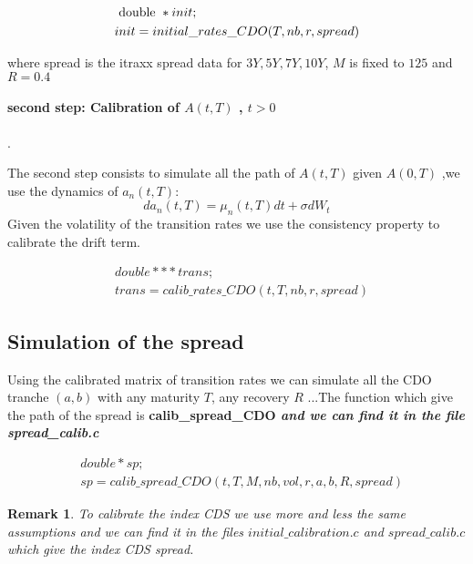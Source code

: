 \documentclass[reqno,11pt,twoside,english]{report}
\newtheorem{Remark}{Remark}
\newcommand{\1}{{1} \hspace{-0.25 em}{\rm I}}
\begin{document}
\begin{equation*}
\begin{split}
&\hbox{ double }*init;\\
&init=initial\_rates\_CDO(T,nb,r,spread)
\end{split}
\end{equation*}

where spread is the itraxx spread data  for  $3Y,5Y,7Y,10 Y$, $M$ is fixed to $125$ and $R=0.4$ 

\paragraph{ second step: Calibration of $A(t,T)$ , $t>0$}
.\par\medskip
The second step consists to simulate all the path of $A(t,T)$ given $A(0,T)$ ,we use the dynamics of $a_n(t,T)$:
$$da_n(t,T)=\mu_n(t,T)dt +\sigma dW_t$$
Given the volatility of the transition rates we use the consistency property to calibrate the drift  term.

\begin{equation*}
\begin{split}
&double ***trans;\\
& trans=calib\_rates\_CDO(t,T,nb,r,spread)
\end{split}
\end{equation*}
  
\subsection{ Simulation of the spread}
Using the calibrated matrix of transition rates we can  simulate all the CDO tranche  $(a,b)$ with any maturity $T$, any recovery $R$ ...The function which give the path of the spread is \bf calib\_spread\_CDO \sl and we can find it in the file \bf spread\_calib.c \sl 

\begin{equation*}
\begin{split}
&double *sp;\\
&sp=calib\_spread\_CDO(t,T,M,nb,vol,r,a,b,R,spread)
\end{split}
\end{equation*}

\begin{Remark}
To calibrate the index CDS we use more and less the same assumptions and we can find it in the files $initial\_calibration.c$ and $spread\_calib.c$ which give the index CDS spread. 
\end{Remark}
\end{document}
